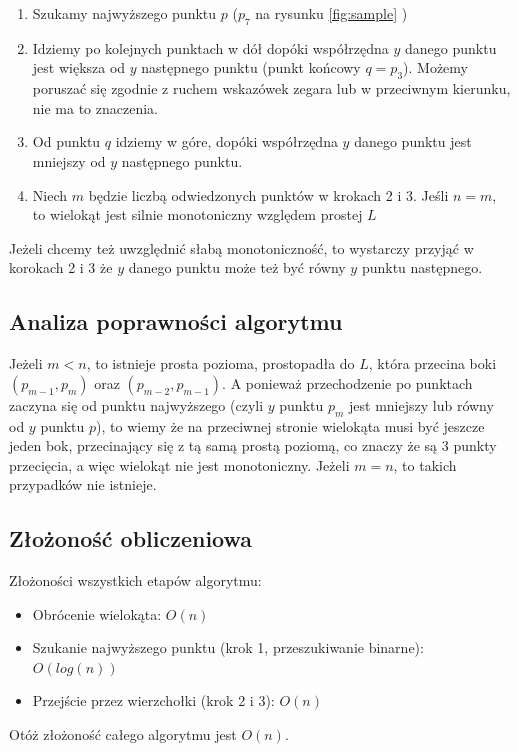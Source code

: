 \documentclass[12pt, a4paper]{article}
\begin{document}
\begin{enumerate}
    \item Szukamy najwyższego punktu $p$ ($p_7$ na rysunku \ref{fig:sample} )
    \item Idziemy po kolejnych punktach w dół dopóki współrzędna $y$ danego punktu jest większa od $y$ następnego punktu (punkt końcowy $q = p_3$). Możemy poruszać się zgodnie z ruchem
    wskazówek zegara lub w przeciwnym kierunku, nie ma to znaczenia.
    \item Od punktu $q$ idziemy w góre, dopóki współrzędna $y$ danego punktu jest mniejszy od $y$ następnego punktu.
    \item Niech $m$ będzie liczbą odwiedzonych punktów w krokach 2 i 3. Jeśli $n = m$, to wielokąt jest silnie monotoniczny względem prostej $L$
\end{enumerate}

Jeżeli chcemy też uwzględnić słabą monotoniczność, to wystarczy przyjąć w korokach 2 i 3 że $y$ danego punktu może też być równy $y$ punktu następnego.

\subsection*{Analiza poprawności algorytmu}

Jeżeli $m < n$, to istnieje prosta pozioma, prostopadła do $L$, która przecina boki $(p_{m-1}, p_{m})$ oraz $(p_{m-2}, p_{m-1})$. A ponieważ przechodzenie po punktach zaczyna się od punktu najwyższego (czyli $y$ punktu $p_m$ jest mniejszy lub równy od $y$ punktu $p$), to wiemy
że na przeciwnej stronie wielokąta musi być jeszcze jeden bok, przecinający się z tą samą prostą poziomą, co znaczy że są 3 punkty przecięcia, a więc wielokąt nie jest monotoniczny. Jeżeli $m = n$, to takich przypadków nie istnieje.


\subsection*{Złożoność obliczeniowa}

Złożoności wszystkich etapów algorytmu:
\begin{itemize}
    \item Obrócenie wielokąta: $O(n)$
    \item Szukanie najwyższego punktu (krok 1, przeszukiwanie binarne): $O(log(n))$
    \item Przejście przez wierzchołki (krok 2 i 3): $O(n)$
\end{itemize}
Otóż złożoność całego algorytmu jest $O(n)$.
\end{document}
